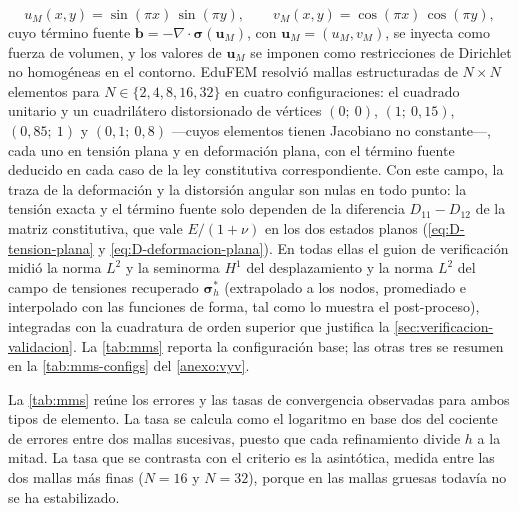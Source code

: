 \begin{equation}
u_M(x,y) = \sin(\pi x)\,\sin(\pi y), \qquad v_M(x,y) = \cos(\pi x)\,\cos(\pi y),
\label{eq:mms-solucion}
\end{equation}
cuyo término fuente $\bm{b} = -\nabla\cdot\bm{\sigma}(\bm{u}_M)$, con $\bm{u}_M = (u_M, v_M)$, se inyecta como fuerza de volumen, y los valores de $\bm{u}_M$ se imponen como restricciones de Dirichlet no homogéneas en el contorno. EduFEM resolvió mallas estructuradas de $N\times N$ elementos para $N\in\{2,4,8,16,32\}$ en cuatro configuraciones: el cuadrado unitario y un cuadrilátero distorsionado de vértices $(0;\ 0)$, $(1;\ 0{,}15)$, $(0{,}85;\ 1)$ y $(0{,}1;\ 0{,}8)$ —cuyos elementos tienen Jacobiano no constante—, cada uno en tensión plana y en deformación plana, con el término fuente deducido en cada caso de la ley constitutiva correspondiente. Con este campo, la traza de la deformación y la distorsión angular son nulas en todo punto: la tensión exacta y el término fuente solo dependen de la diferencia $D_{11}-D_{12}$ de la matriz constitutiva, que vale $E/(1+\nu)$ en los dos estados planos (\autoref{eq:D-tension-plana} y \autoref{eq:D-deformacion-plana}). En todas ellas el guion de verificación midió la norma $L^2$ y la seminorma $H^1$ del desplazamiento y la norma $L^2$ del campo de tensiones recuperado $\bm{\sigma}^*_h$ (extrapolado a los nodos, promediado e interpolado con las funciones de forma, tal como lo muestra el post-proceso), integradas con la cuadratura de orden superior que justifica la \autoref{sec:verificacion-validacion}. La \autoref{tab:mms} reporta la configuración base; las otras tres se resumen en la \autoref{tab:mms-configs} del \autoref{anexo:vyv}.

La \autoref{tab:mms} reúne los errores y las tasas de convergencia observadas para ambos tipos de elemento. La tasa se calcula como el logaritmo en base dos del cociente de errores entre dos mallas sucesivas, puesto que cada refinamiento divide $h$ a la mitad. La tasa que se contrasta con el criterio es la asintótica, medida entre las dos mallas más finas ($N=16$ y $N=32$), porque en las mallas gruesas todavía no se ha estabilizado.

